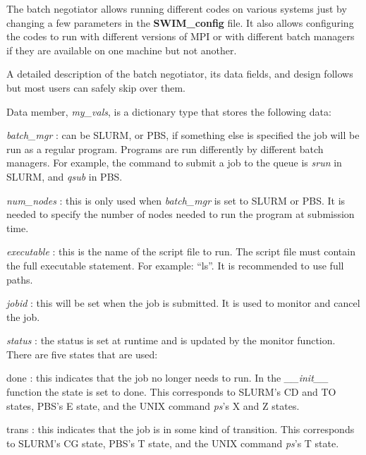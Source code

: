 The batch negotiator allows running different codes on various systems just by
changing a few parameters in the {\bf SWIM\_config} file.  It also allows
configuring the codes to run with different versions of MPI or with different
batch managers if they are available on one machine but not another.

A detailed description of the batch negotiator, its data fields, and design
follows but most users can safely skip over them.
\begin{itemizer}
\item Data member, {\em my\_vals}, is a dictionary type that stores the
  following data:
  \begin{itemizer}
  \item  {\em batch\_mgr} : can be SLURM, or PBS, if something else is
    specified the job will be run as a regular program.  Programs are run
    differently by different batch managers.  For example, the command to
    submit a job to the queue is {\em srun} in SLURM, and {\em qsub} in PBS.
  \item  {\em num\_nodes} : this is only used when {\em batch\_mgr} is set to
    SLURM or PBS.  It is needed to specify the number of nodes needed to run
    the program at submission time.
  \item  {\em executable} : this is the name of the script file to run.  The
    script file must contain the full executable statement.  For example: ``ls''.  It is 
    recommended to use full paths.
  \item {\em jobid} : this will be set when the job is submitted.  It is used
    to monitor and cancel the job.
  \item  {\em status} : the status is set at runtime and is updated by the
    monitor function.  There are five states that are used:
    \begin{itemizer}
    \item  done : this indicates that the job no longer needs to run.  In the
      {\em \_\_init\_\_} function the state is set to done.  This corresponds to SLURM's CD
      and TO states, PBS's E state, and the UNIX command {\em ps}'s X and Z states.
    \item  trans : this indicates that the job is in some kind of transition.
      This corresponds to SLURM's CG state, PBS's T state, and the UNIX command
      {\em ps}'s T state.

\end{itemizer}
\end{itemizer}
\end{itemizer}
